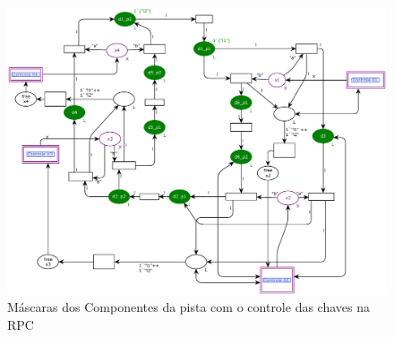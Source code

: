 \begin{figure}[ht]
    \centering
    \caption{Máscaras dos Componentes da pista com o controle das chaves na RPC}
    \label{fig:pista_chaves_rpc}
    \includegraphics[width=1\linewidth]{figures//Simulation//Modelagem/pista_com_chaves.eps}
\end{figure}
